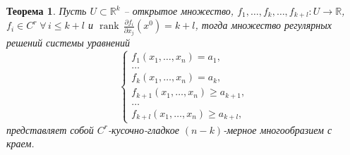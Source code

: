 \documentclass[a5paper]{article}
\newcounter{through}
\theoremstyle{plain}
\newtheorem{theorem}[through]{Теорема}
\theoremstyle{definition}
\numberwithin{through}{section}
\numberwithin{equation}{section}
\DeclareMathOperator{\rank}{rank}
\begin{document}
\begin{theorem}
	Пусть $U \subset \mathbb{R}^k$ -- открытое множество, $f_1, \ldots, f_{k}, \ldots ,f_{k+l} : 
	U \to \mathbb{R}$, $f_i \in C^r \; \forall \, i \leq k + l$ и $\rank \, \frac{\partial f_i}{\partial x_j} (x^0) = k + l$,  тогда множество регулярных решений системы уравнений
	\begin{equation*}
	\begin{cases}
	f_1(x_1, \ldots, x_n) = a_1,
	\\
	\ldots
	\\
	f_k(x_1, \ldots, x_n) = a_k,
	\\
	f_{k+1}(x_1, \ldots, x_n) \geq a_{k+1},
	\\
	\ldots
	\\
	f_{k+l}(x_1, \ldots, x_n) \geq a_{k+l},
	\end{cases}
	\end{equation*}
	представляет собой $C^r$-кусочно-гладкое $(n-k)$-мерное многообразием с краем.
\end{theorem}
\end{document}
